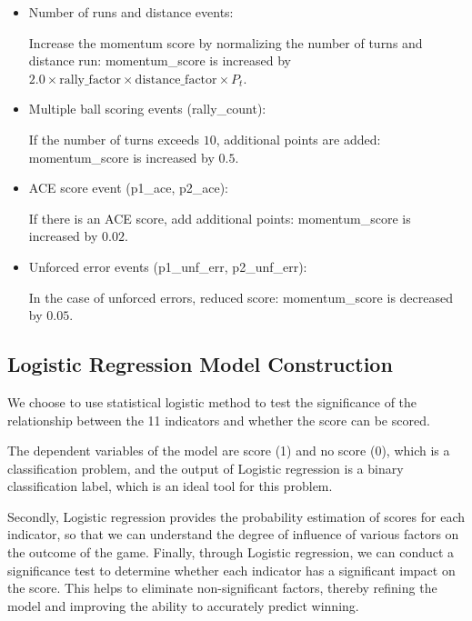 \documentclass{mcmthesis}  %
\begin{document}
\begin{itemize}
\item Number of runs and distance events:\par

Increase the momentum score by normalizing the number of turns and distance run: momentum\_score is increased by $2.0 \times \text{rally\_factor} \times \text{distance\_factor} \times P_t$.

\item Multiple ball scoring events (rally\_count):\par

If the number of turns exceeds $10$, additional points are added: momentum\_score is increased by $0.5$.

\item  ACE score event (p1\_ace, p2\_ace):\par

If there is an ACE score, add additional points: momentum\_score is increased by $0.02$.

\item Unforced error events (p1\_unf\_err, p2\_unf\_err):\par

In the case of unforced errors, reduced score: momentum\_score is decreased by $0.05$.

\end{itemize}

\subsection{Logistic Regression Model Construction}
\hspace{1.5em} We choose to use statistical logistic method to test the significance of the relationship between the 11 indicators and whether the score can be scored.
\par The dependent variables of the model are score (1) and no score (0), which is a classification problem, and the output of Logistic regression is a binary classification label, which is an ideal tool for this problem.
\par Secondly, Logistic regression provides the probability estimation of scores for each indicator, so that we can understand the degree of influence of various factors on the outcome of the game. Finally, through Logistic regression, we can conduct a significance test to determine whether each indicator has a significant impact on the score. This helps to eliminate non-significant factors, thereby refining the model and improving the ability to accurately predict winning.
\end{document}
